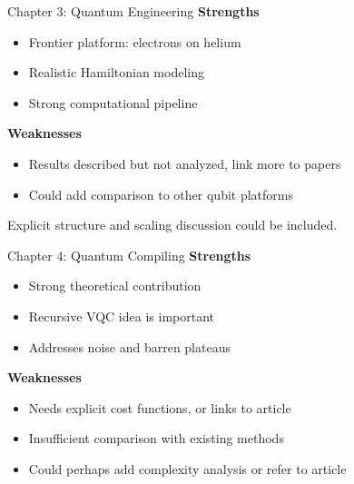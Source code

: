 \documentclass[aspectratio=169]{beamer}
\begin{document}
\begin{frame}{Chapter 3: Quantum Engineering}
\textbf{Strengths}
\begin{itemize}
    \item Frontier platform: electrons on helium
    \item Realistic Hamiltonian modeling
    \item Strong computational pipeline
\end{itemize}

\medskip

\textbf{Weaknesses}
\begin{itemize}
    \item Results described but not analyzed, link more to papers
    \item Could add  comparison to other qubit platforms
\end{itemize}

\medskip


Explicit structure and scaling discussion could be included.
\end{frame}

\begin{frame}{Chapter 4: Quantum Compiling}
\textbf{Strengths}
\begin{itemize}
    \item Strong theoretical contribution
    \item Recursive VQC idea is important
    \item Addresses noise and barren plateaus
\end{itemize}

\medskip

\textbf{Weaknesses}
\begin{itemize}
    \item Needs explicit cost functions, or links to article
    \item Insufficient comparison with existing methods
    \item Could perhaps add complexity analysis or refer to article
\end{itemize}

\medskip


\end{frame}
\end{document}

